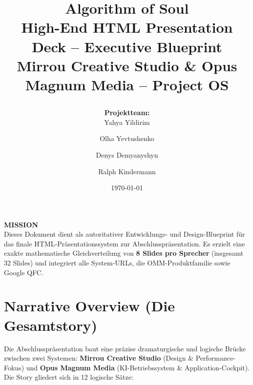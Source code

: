 \documentclass[11pt,a4paper]{article}
\title{
    \vspace{-1.5cm}
    \begin{center}
        \color{brandonyx}\Huge\bfseries Algorithm of Soul\\
        \large\color{brandgold}High-End HTML Presentation Deck -- Executive Blueprint\\
        \vspace{0.3cm}
        \small\color{mutedgray}Mirrou Creative Studio \& Opus Magnum Media -- Project OS
    \end{center}
}
\author{\textbf{Projektteam:}\\ Yahya Yildirim \and Olha Yevtushenko \and Denys Demyanyshyn \and Ralph Kindermann}
\date{\today}
\begin{document}
\maketitle

\begin{tcolorbox}[colback=branddark,colframe=branddark,arc=3mm,text fill,coltext=white]
    \begin{center}
        \textbf{\large MISSION} \\
        \vspace{0.2cm}
        \small Dieses Dokument dient als autoritativer Entwicklungs- und Design-Blueprint für das finale HTML-Präsentationssystem zur Abschlusspräsentation. Es erzielt eine exakte mathematische Gleichverteilung von \textbf{8 Slides pro Sprecher} (insgesamt 32 Slides) und integriert alle System-URLs, die OMM-Produktfamilie sowie Google QFC.
    \end{center}
\end{tcolorbox}

\tableofcontents
\newpage

\section{Narrative Overview (Die Gesamtstory)}
Die Abschlusspräsentation baut eine präzise dramaturgische und logische Brücke zwischen zwei Systemen: \textbf{Mirrou Creative Studio} (Design \& Performance-Fokus) und \textbf{Opus Magnum Media} (KI-Betriebssystem \& Application-Cockpit). Die Story gliedert sich in 12 logische Sätze:
\end{document}
